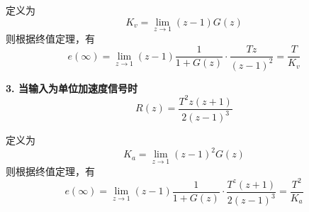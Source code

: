 定义为
\begin{equation}
	K_v = \lim\limits_{z \to 1} (z-1)G(z)
\end{equation}
则根据终值定理，有
\begin{equation}
	e(\infty) = \lim\limits_{z \to 1} (z - 1)\dfrac{1}{1 + G(z)} \cdot \dfrac{Tz}{(z-1)^2} = \dfrac{T}{K_v}
\end{equation}
\vspace*{0.5em}

\noindent \textbf{3. 当输入为单位加速度信号时}
\begin{equation}
	R(z) = \dfrac{T^2z(z+1)}{2(z-1)^3}
\end{equation}

定义为
\begin{equation}
	K_a = \lim\limits_{z \to 1} (z-1)^2G(z)
\end{equation}
则根据终值定理，有
\begin{equation}
	e(\infty) = \lim\limits_{z \to 1} (z - 1)\dfrac{1}{1 + G(z)} \cdot \dfrac{T^z(z+1)}{2(z-1)^3} = \dfrac{T^2}{K_a}
\end{equation}

